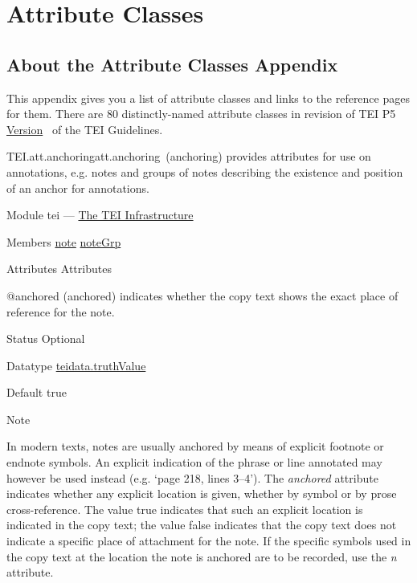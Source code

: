 
\section[{Attribute Classes}]{Attribute Classes}\label{REF-CLASSES-ATTS}
\subsection[{About the Attribute Classes Appendix}]{About the Attribute Classes Appendix}\par
This appendix gives you a list of attribute classes and links to the reference pages for them. There are 80 distinctly-named attribute classes in revision  of TEI P5 \hyperref[ABTEI4]{Version}  of the TEI Guidelines.
\begin{reflist}
\item[]\begin{specHead}{TEI.att.anchoring}{att.anchoring} (anchoring) provides attributes for use on annotations, e.g. notes and groups of notes describing the existence and position of an anchor for annotations.\end{specHead} 
    \item[{Module}]
  tei — \hyperref[ST]{The TEI Infrastructure}
    \item[{Members}]
  \hyperref[TEI.note]{note} \hyperref[TEI.noteGrp]{noteGrp}
    \item[{Attributes}]
  Attributes\hfil\\[-10pt]\begin{sansreflist}
    \item[@anchored]
  (anchored) indicates whether the copy text shows the exact place of reference for the note.
\begin{reflist}
    \item[{Status}]
  Optional
    \item[{Datatype}]
  \hyperref[TEI.teidata.truthValue]{teidata.truthValue}
    \item[{Default}]
  true
    \item[{Note}]
  \par
In modern texts, notes are usually anchored by means of explicit footnote or endnote symbols. An explicit indication of the phrase or line annotated may however be used instead (e.g. ‘page 218, lines 3–4’). The {\itshape anchored} attribute indicates whether any explicit location is given, whether by symbol or by prose cross-reference. The value true indicates that such an explicit location is indicated in the copy text; the value false indicates that the copy text does not indicate a specific place of attachment for the note. If the specific symbols used in the copy text at the location the note is anchored are to be recorded, use the {\itshape n} attribute.

\end{reflist}
\end{sansreflist}
\end{reflist}
